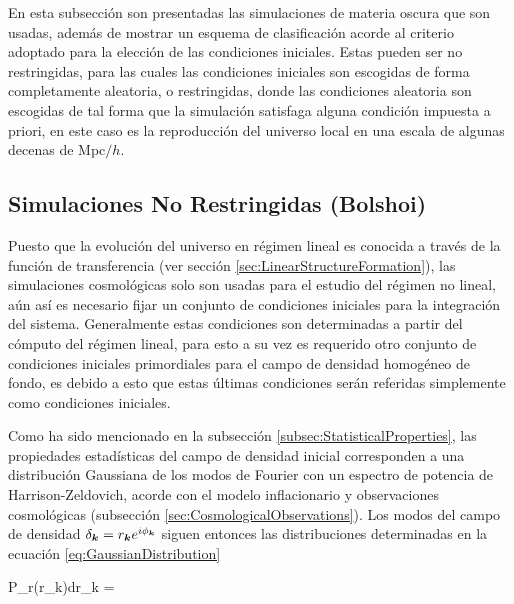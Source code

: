 En esta subsección son presentadas las simulaciones de materia oscura que 
son usadas, además de mostrar un esquema de clasificación acorde al 
criterio adoptado para la elección de las condiciones iniciales. Estas 
pueden ser no restringidas, para las cuales las condiciones iniciales 
son escogidas de forma completamente aleatoria, o restringidas, donde las 
condiciones aleatoria son escogidas de tal forma que la simulación 
satisfaga alguna condición impuesta a priori, en este caso es la 
reproducción del universo local en una escala de algunas decenas de 
Mpc$/h$.


	\subsection{Simulaciones No Restringidas (Bolshoi)}
	\label{subsec:UnconstrainedSimulations}


Puesto que la evolución del universo en régimen lineal es conocida a 
través de la función de transferencia (ver sección 
\ref{sec:LinearStructureFormation}), las simulaciones cosmológicas solo 
son usadas para el estudio del régimen no lineal, aún así es necesario
fijar un conjunto de condiciones iniciales para la integración del sistema.
Generalmente estas condiciones son determinadas a partir del cómputo del 
régimen lineal, para esto a su vez es requerido otro conjunto de condiciones 
iniciales primordiales para el campo de densidad homogéneo de fondo, 
es debido a esto que estas últimas condiciones serán referidas simplemente 
como condiciones iniciales.


Como ha sido mencionado en la subsección \ref{subsec:StatisticalProperties},
las propiedades estadísticas del campo de densidad inicial corresponden a 
una distribución Gaussiana de los modos de Fourier con un espectro de
potencia de Harrison-Zeldovich, acorde con el modelo inflacionario y 
observaciones cosmológicas (subsección \ref{sec:CosmologicalObservations}).
Los modos del campo de densidad $\delta_{\boldsymbol{ k }} = 
r_{\boldsymbol{ k }}e^{i\phi_{\boldsymbol{ k }}}$ siguen entonces las distribuciones 
determinadas en la ecuación \ref{eq:GaussianDistribution}


{ P_r(r_{\bds k})dr_{\bds k} = \exp{}
 }



